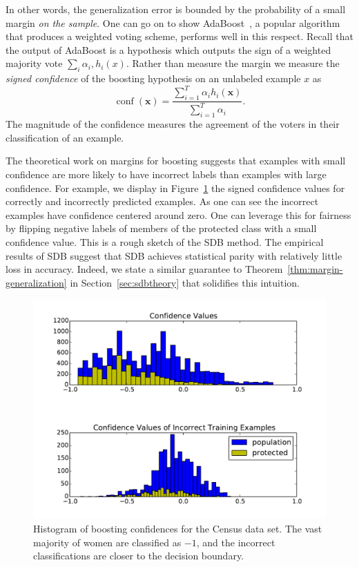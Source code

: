 \documentclass[twoside,leqno,twocolumn]{article}
\DeclareMathOperator{\conf}{conf}
\begin{document}
In other words, the generalization error is bounded by the probability of a
small margin \emph{on the sample}. One can go on to show
AdaBoost~\cite{SchapireF12}, a popular algorithm that produces a weighted
voting scheme, performs well in this respect. Recall that the output of
AdaBoost is a hypothesis which outputs the sign of a weighted majority vote
$\sum_i \alpha_i, h_i(x)$. Rather than measure the margin we measure the
\emph{signed confidence} of the boosting hypothesis on an unlabeled example $x$
as $$ \conf(\mathbf x) = \frac{\sum_{i=1}^T \alpha_i h_i(\mathbf
x)}{\sum_{i=1}^T \alpha_i}.$$ The magnitude of the confidence measures the
agreement of the voters in their classification of an example.

The theoretical work on margins for boosting suggests that examples with small
confidence are more likely to have incorrect labels than examples with large
confidence. For example, we display in Figure~\ref{fig:boosting-margins} the
signed confidence values for correctly and incorrectly predicted examples. As
one can see the incorrect examples have confidence centered around zero. One
can leverage this for fairness by flipping negative labels of members of the
protected class with a small confidence value. This is a rough sketch of the SDB
method. The empirical results of SDB suggest that SDB achieves statistical
parity with relatively little loss in accuracy. Indeed, we state a similar guarantee
to Theorem~\ref{thm:margin-generalization} in Section~\ref{sec:sdbtheory} that
solidifies this intuition.

\begin{figure}[t]
\centering
\includegraphics[width=\columnwidth]{images/adult-confidence-histogram.pdf}
\caption{Histogram of boosting confidences for the Census data set. The vast
majority of women are classified as $-1$, and the incorrect classifications are
closer to the decision boundary.}
\label{fig:boosting-margins}
\end{figure}
\end{document}
